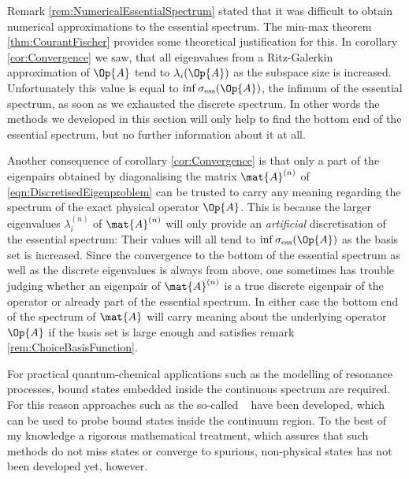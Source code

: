 \begin{rem}
	\label{rem:PracticalNum}
Remark \vref{rem:NumericalEssentialSpectrum}
stated that it was difficult
to obtain numerical approximations to the essential spectrum.
The min-max theorem \ref{thm:CourantFischer}
provides some theoretical justification for this.
In corollary \ref{cor:Convergence} we saw,
that all eigenvalues from a Ritz-Galerkin approximation
of $\Op{A}$ tend to $\lambda_i(\Op{A})$
as the subspace size is increased.
Unfortunately this value is equal to $\inf \sigma_\text{ess}(\Op{A})$,
the infimum of the essential spectrum,
as soon as we exhausted the discrete spectrum.
In other words the methods we developed in this section
will only help to find the bottom end of the essential spectrum,
but no further information about it at all.

Another consequence of corollary \ref{cor:Convergence} is
that only a part of the eigenpairs obtained by
diagonalising the matrix $\mat{A}^{(n)}$ of \eqref{eqn:DiscretisedEigenproblem}
can be trusted to carry any meaning regarding
the spectrum of the exact physical operator $\Op{A}$.
This is because the larger eigenvalues $\lambda_i^{(n)}$
of $\mat{A}^{(n)}$ will only provide an \emph{artificial}
discretisation of the essential spectrum:
Their values will all tend to $\inf \sigma_\text{ess}(\Op{A})$
as the basis set is increased.
Since the convergence to the bottom of the essential spectrum
as well as the discrete eigenvalues is always from above,
one sometimes has trouble judging whether
an eigenpair of $\mat{A}^{(n)}$
is a true discrete eigenpair of the operator or already
part of the essential spectrum.
In either case the bottom end of the spectrum of $\mat{A}$
will carry meaning about the underlying operator $\Op{A}$
if the basis set is large enough and
satisfies remark \vref{rem:ChoiceBasisFunction}.

For practical quantum-chemical applications
such as the modelling of resonance processes,
bound states embedded inside the continuous spectrum are required.
For this reason approaches such as the so-called
~\cite{Bacic1982,Hazi1970,Riss1993}
have been developed,
which can be used to probe bound states inside the continuum region.
To the best of my knowledge a rigorous mathematical treatment,
which assures that such methods do not miss states
or converge to spurious, non-physical states has not been developed yet,
however.
\end{rem}
